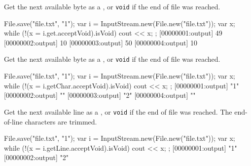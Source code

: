 \begin{urbiscriptapi}
\item[get]
  Get the next available byte as a , or
  \lstinline|void| if the end of file was reached.
\begin{urbiscript}
{
  File.save("file.txt", "1\n");
  var i = InputStream.new(File.new("file.txt"));
  var x;
  while (!(x = i.get.acceptVoid).isVoid)
    cout << x;
};
[00000001:output] 49
[00000002:output] 10
[00000003:output] 50
[00000004:output] 10
\end{urbiscript}

\item[getChar]
  Get the next available byte as a , or
  \lstinline|void| if the end of file was reached.
\begin{urbiscript}
{
  File.save("file.txt", "1\n");
  var i = InputStream.new(File.new("file.txt"));
  var x;
  while (!(x = i.getChar.acceptVoid).isVoid)
    cout << x;
};
[00000001:output] "1"
[00000002:output] "\n"
[00000003:output] "2"
[00000004:output] "\n"
\end{urbiscript}

\item[getLine]
  Get the next available line as a , or
  \lstinline|void| if the end of file was reached.  The end-of-line
  characters are trimmed.
\begin{urbiscript}
{
  File.save("file.txt", "1\n");
  var i = InputStream.new(File.new("file.txt"));
  var x;
  while (!(x = i.getLine.acceptVoid).isVoid)
    cout << x;
};
[00000001:output] "1"
[00000002:output] "2"
\end{urbiscript}
\end{urbiscriptapi}


